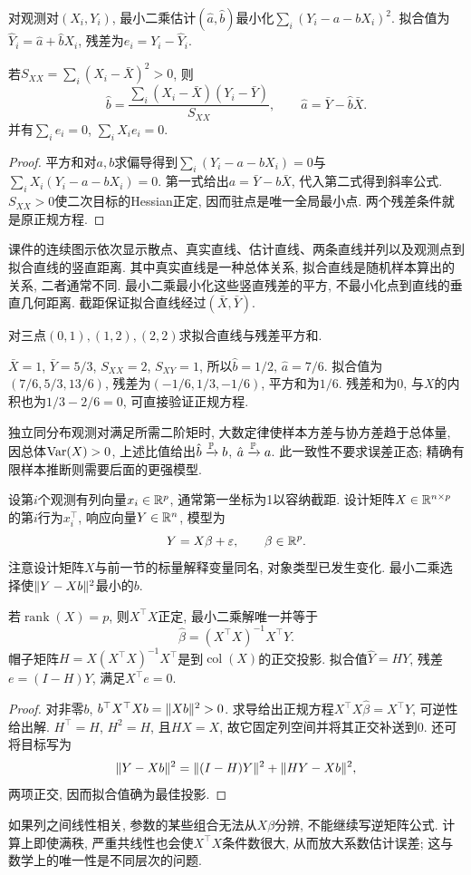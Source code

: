 \begin{definition}[简单回归的最小二乘]
对观测对$(X_i,Y_i)$, 最小二乘估计$(\hat a,\hat b)$最小化$\sum_i(Y_i-a-bX_i)^2$. 拟合值为$\hat Y_i=\hat a+\hat bX_i$, 残差为$e_i=Y_i-\hat Y_i$.
\end{definition}
\begin{proposition}
若$S_{XX}=\sum_i(X_i-\bar X)^2>0$, 则
\[
 \hat b=\frac{\sum_i(X_i-\bar X)(Y_i-\bar Y)}{S_{XX}},\qquad
 \hat a=\bar Y-\hat b\bar X.
\]
并有$\sum_ie_i=0$, $\sum_iX_ie_i=0$.
\end{proposition}
\begin{proof}
平方和对$a,b$求偏导得到$\sum_i(Y_i-a-bX_i)=0$与$\sum_iX_i(Y_i-a-bX_i)=0$. 第一式给出$a=\bar Y-b\bar X$, 代入第二式得到斜率公式. $S_{XX}>0$使二次目标的Hessian正定, 因而驻点是唯一全局最小点. 两个残差条件就是原正规方程.
\end{proof}
课件的连续图示依次显示散点、真实直线、估计直线、两条直线并列以及观测点到拟合直线的竖直距离. 其中真实直线是一种总体关系, 拟合直线是随机样本算出的关系, 二者通常不同. 最小二乘最小化这些竖直残差的平方, 不最小化点到直线的垂直几何距离. 截距保证拟合直线经过$(\bar X,\bar Y)$.

\begin{example}
对三点$(0,1),(1,2),(2,2)$求拟合直线与残差平方和.
\end{example}
\begin{solution}
$\bar X=1$, $\bar Y=5/3$, $S_{XX}=2$, $S_{XY}=1$, 所以$\hat b=1/2$, $\hat a=7/6$. 拟合值为$(7/6,5/3,13/6)$, 残差为$(-1/6,1/3,-1/6)$, 平方和为$1/6$. 残差和为0, 与$X$的内积也为$1/3-2/6=0$, 可直接验证正规方程.
\end{solution}
独立同分布观测对满足所需二阶矩时, 大数定律使样本方差与协方差趋于总体量, 因总体$\operatorname{Var}(X)>0$, 上述比值给出$\hat b\xrightarrow{\mathbb P} b$, $\hat a\xrightarrow{\mathbb P} a$. 此一致性不要求误差正态; 精确有限样本推断则需要后面的更强模型.

设第$i$个观测有列向量$x_i\in\mathbb R^p$, 通常第一坐标为1以容纳截距. 设计矩阵$X\in\mathbb R^{n\times p}$的第$i$行为$x_i^\top$, 响应向量$Y\in\mathbb R^n$, 模型为
\[
 Y=X\beta+\varepsilon,\qquad\beta\in\mathbb R^p.
\]
注意设计矩阵$X$与前一节的标量解释变量同名, 对象类型已发生变化. 最小二乘选择使$\lVert Y-Xb\rVert^2$最小的$b$.
\begin{theorem}[满列秩正规方程]
若$\operatorname{rank}(X)=p$, 则$X^\top X$正定, 最小二乘解唯一并等于
\[
 \hat\beta=(X^\top X)^{-1}X^\top Y.
\]
帽子矩阵$H=X(X^\top X)^{-1}X^\top$是到$\operatorname{col}(X)$的正交投影. 拟合值$\hat Y=HY$, 残差$e=(I-H)Y$, 满足$X^\top e=0$.
\end{theorem}
\begin{proof}
对非零$b$, $b^\top X^\top Xb=\lVert Xb\rVert^2>0$. 求导给出正规方程$X^\top X\hat\beta=X^\top Y$, 可逆性给出解. $H^\top=H$, $H^2=H$, 且$HX=X$, 故它固定列空间并将其正交补送到0. 还可将目标写为
\[
 \lVert Y-Xb\rVert^2=\lVert (I-H)Y\rVert^2+\lVert HY-Xb\rVert^2,
\]
两项正交, 因而拟合值确为最佳投影.
\end{proof}
如果列之间线性相关, 参数的某些组合无法从$X\beta$分辨, 不能继续写逆矩阵公式. 计算上即使满秩, 严重共线性也会使$X^\top X$条件数很大, 从而放大系数估计误差; 这与数学上的唯一性是不同层次的问题.

